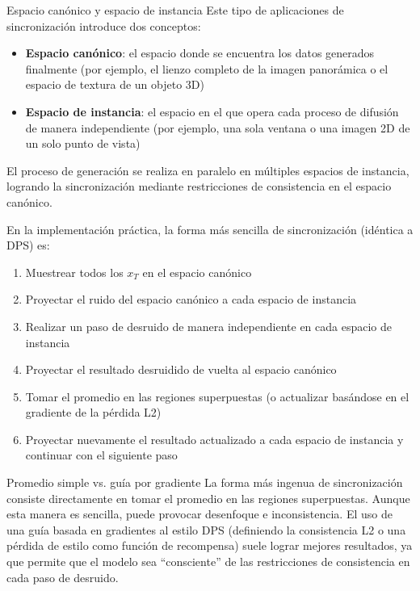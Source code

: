 \documentclass[a4paper]{article}
\begin{document}
\begin{importantbox}{Espacio canónico y espacio de instancia}
Este tipo de aplicaciones de sincronización introduce dos conceptos:
\begin{itemize}
    \item \textbf{Espacio canónico}: el espacio donde se encuentra los datos generados finalmente (por ejemplo, el lienzo completo de la imagen panorámica o el espacio de textura de un objeto 3D)
    \item \textbf{Espacio de instancia}: el espacio en el que opera cada proceso de difusión de manera independiente (por ejemplo, una sola ventana o una imagen 2D de un solo punto de vista)
\end{itemize}
El proceso de generación se realiza en paralelo en múltiples espacios de instancia, logrando la sincronización mediante restricciones de consistencia en el espacio canónico.
\end{importantbox}

En la implementación práctica, la forma más sencilla de sincronización (idéntica a DPS) es:

\begin{enumerate}
    \item Muestrear todos los $x_T$ en el espacio canónico
    \item Proyectar el ruido del espacio canónico a cada espacio de instancia
    \item Realizar un paso de desruido de manera independiente en cada espacio de instancia
    \item Proyectar el resultado desruidido de vuelta al espacio canónico
    \item Tomar el promedio en las regiones superpuestas (o actualizar basándose en el gradiente de la pérdida L2)
    \item Proyectar nuevamente el resultado actualizado a cada espacio de instancia y continuar con el siguiente paso
\end{enumerate}

\begin{warningbox}{Promedio simple vs. guía por gradiente}
La forma más ingenua de sincronización consiste directamente en tomar el promedio en las regiones superpuestas. Aunque esta manera es sencilla, puede provocar desenfoque e inconsistencia. El uso de una guía basada en gradientes al estilo DPS (definiendo la consistencia L2 o una pérdida de estilo como función de recompensa) suele lograr mejores resultados, ya que permite que el modelo sea ``consciente'' de las restricciones de consistencia en cada paso de desruido.
\end{warningbox}
\end{document}
